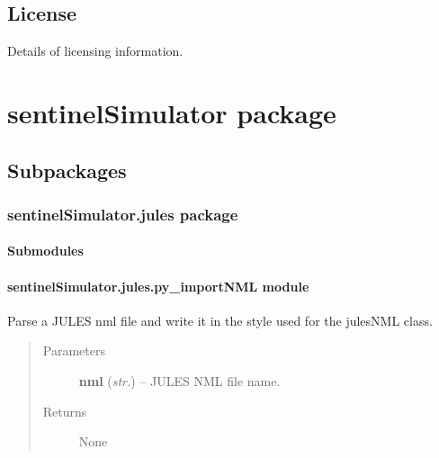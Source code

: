\documentclass[letterpaper,10pt,english]{sphinxmanual}
\begin{document}
\subsection{License}
\label{source/README:license}
Details of licensing information.


\section{sentinelSimulator package}
\label{source/sentinelSimulator:sentinelsimulator-package}\label{source/sentinelSimulator::doc}

\subsection{Subpackages}
\label{source/sentinelSimulator:subpackages}

\subsubsection{sentinelSimulator.jules package}
\label{source/sentinelSimulator.jules:sentinelsimulator-jules-package}\label{source/sentinelSimulator.jules::doc}

\paragraph{Submodules}
\label{source/sentinelSimulator.jules:submodules}

\paragraph{sentinelSimulator.jules.py\_importNML module}
\label{source/sentinelSimulator.jules:sentinelsimulator-jules-py-importnml-module}\label{source/sentinelSimulator.jules:module-sentinelSimulator.jules.py_importNML}

\begin{fulllineitems}
\label{source/sentinelSimulator.jules:sentinelSimulator.jules.py_importNML.importJulesNML}
Parse a JULES nml file and write it in the style used for the
julesNML class.
\begin{quote}\begin{description}
\item[{Parameters}] \leavevmode
\textbf{nml} (\emph{str.}) -- JULES NML file name.

\item[{Returns}] \leavevmode
None

\end{description}\end{quote}

\end{fulllineitems}
\end{document}
